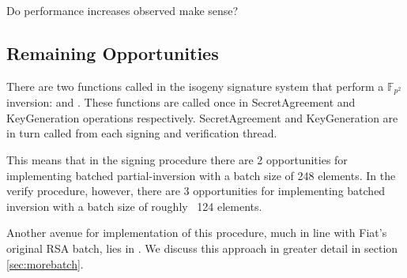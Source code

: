 Do performance increases observed make sense?\\

\subsection{Remaining Opportunities}
There are two functions called in the isogeny signature system that perform a $\mathbb{F}_{p^{2}}$ inversion:  and . These functions are called once in SecretAgreement and KeyGeneration operations respectively. SecretAgreement and KeyGeneration are in turn called from each signing and verification thread.

This means that in the signing procedure there are 2 opportunities for implementing batched partial-inversion with a batch size of 248 elements. In the verify procedure, however, there are 3 opportunities for implementing batched inversion with a batch size of roughly ~124 elements.

Another avenue for implementation of this procedure, much in line with Fiat's original RSA batch, lies in . We discuss this approach in greater detail in section \ref{sec:morebatch}.
